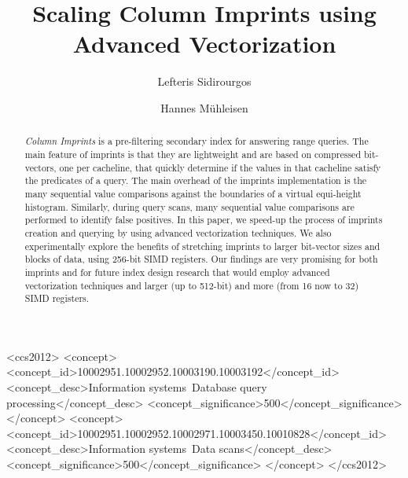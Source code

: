 \documentclass[sigconf]{acmart}
\begin{document}
\title{Scaling Column Imprints using Advanced Vectorization}

\author{Lefteris Sidirourgos}

\author{Hannes M\"uhleisen}

\lstset{basicstyle=\ttfamily}


\begin{abstract}
{\em Column Imprints} is a pre-filtering secondary index for answering range queries. The main feature of imprints is that they are
lightweight and are based on compressed bit-vectors, one per cacheline, that quickly determine if the values in that cacheline 
satisfy the predicates of a query. The main overhead of the imprints implementation is the many sequential value comparisons against 
the boundaries of a virtual equi-height histogram. Similarly, during query scans, many sequential value comparisons are performed to
identify false positives. In this paper, we speed-up the process of imprints creation and querying by using advanced vectorization 
techniques. We also experimentally explore the benefits of stretching imprints to larger bit-vector sizes and blocks of data, using
256-bit SIMD registers. Our findings are very promising for both imprints and for future index design research that would employ 
advanced vectorization techniques and larger (up to 512-bit) and more (from 16 now to 32) SIMD registers.

\end{abstract}

\begin{CCSXML}
<ccs2012>
<concept>
<concept_id>10002951.10002952.10003190.10003192</concept_id>
<concept_desc>Information systems~Database query processing</concept_desc>
<concept_significance>500</concept_significance>
</concept>
<concept>
<concept_id>10002951.10002952.10002971.10003450.10010828</concept_id>
<concept_desc>Information systems~Data scans</concept_desc>
<concept_significance>500</concept_significance>
</concept>
</ccs2012>
\end{CCSXML}

\end{document}
